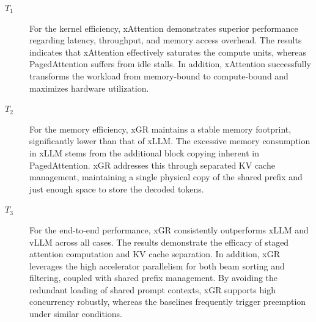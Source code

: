 \documentclass[nonacm,sigconf]{acmart}
\begin{document}
\begin{description}

\item[$T_1$] For the kernel efficiency, xAttention demonstrates superior performance regarding latency, throughput, and memory access overhead. The results indicates that xAttention effectively saturates the compute units, whereas PagedAttention suffers from idle stalls. In addition, xAttention successfully transforms the workload from memory-bound to compute-bound and maximizes hardware utilization.

\item[$T_2$] For the memory efficiency, xGR maintains a stable memory footprint, significantly lower than that of xLLM. The excessive memory consumption in xLLM stems from the additional block copying inherent in PagedAttention. xGR addresses this through separated KV cache management, maintaining a single physical copy of the shared prefix and just enough space to store the decoded tokens.

\item[$T_3$] For the end-to-end performance, xGR consistently outperforms xLLM and vLLM across all cases. The results demonstrate the efficacy of staged attention computation and KV cache separation. In addition, xGR leverages the high accelerator parallelism for both beam sorting and filtering, coupled with shared prefix management. By avoiding the redundant loading of shared prompt contexts, xGR supports high concurrency robustly, whereas the baselines frequently trigger preemption under similar conditions. 

\end{description}



%
%
%
%
%
%
%
%
\end{document}
